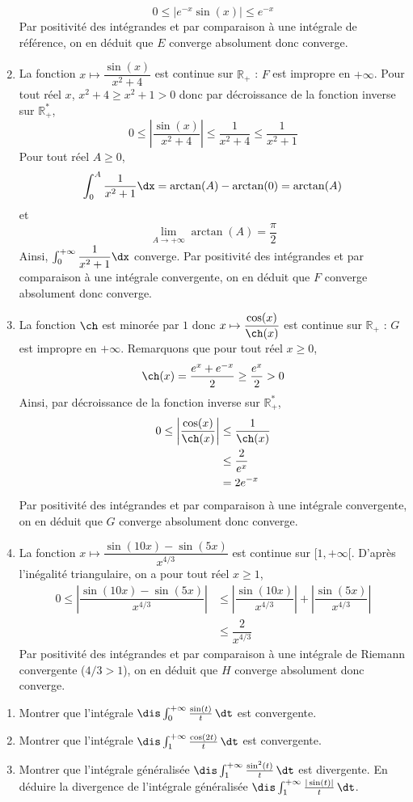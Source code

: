 \documentclass[a4paper,10pt]{report}
\begin{document}
\begin{enumerate}
$$ 0 \leq \vert  e^{-x} \sin(x)  \vert \leq e^{-x}$$
Par positivité des intégrandes et par comparaison à une intégrale de référence, on en déduit que $E$ converge absolument donc converge.
\item La fonction $x \mapsto \dfrac{\sin(x)}{x^2+4}$ est continue sur $\mathbb{R}_+$ : $F$ est impropre en $+ \infty$. Pour tout réel $x$, $x^2+4 \geq x^2+1>0$ donc par décroissance de la fonction inverse sur $\mathbb{R}_+^*$,
$$ 0 \leq \left\vert \dfrac{\sin(x)}{x^2+4} \right\vert \leq \dfrac{1}{x^2+4} \leq \dfrac{1}{x^2+1}$$
Pour tout réel $A \geq 0$,
$$ \int_0^A \dfrac{1}{x^2+1} \dx = \arctan(A)- \arctan(0)= \arctan(A)$$
et 
$$ \lim_{A \rightarrow + \infty} \arctan(A) = \dfrac{\pi}{2}$$
Ainsi, $\int_0^{+ \infty} \dfrac{1}{x^2+1} \dx$ converge. Par positivité des intégrandes et par comparaison à une intégrale convergente, on en déduit que $F$ converge absolument donc converge.
\item La fonction $\ch$ est minorée par $1$ donc $x \mapsto \dfrac{\cos(x)}{\ch(x)}$ est continue sur $\mathbb{R}_+$ : $G$ est impropre en $+ \infty$. Remarquons que pour tout réel $x \geq 0$,
$$ \ch(x) = \dfrac{e^x+e^{-x}}{2} \geq \dfrac{e^x}{2} >0$$
Ainsi, par décroissance de la fonction inverse sur $\mathbb{R}_+^*$,
\begin{align*}
0 \leq \left\vert \dfrac{\cos(x)}{\ch(x)} \right\vert & \leq \dfrac{1}{\ch(x)} \\
& \leq \dfrac{2}{e^x} \\
& = 2e^{-x}
\end{align*}
Par positivité des intégrandes et par comparaison à une intégrale convergente, on en déduit que $G$ converge absolument donc converge.
\item La fonction $x\mapsto  \dfrac{\sin(10x)-\sin(5x)}{x^{4/3}}$ est continue sur $[1, + \infty[$. D'après l'inégalité triangulaire, on a pour tout réel $x \geq 1$,
\begin{align*}
0 \leq \left\vert  \dfrac{\sin(10x)-\sin(5x)}{x^{4/3}} \right\vert & \leq \left\vert  \dfrac{\sin(10x)}{x^{4/3}} \right\vert + \left\vert  \dfrac{\sin(5x)}{x^{4/3}} \right\vert \\
& \leq \dfrac{2}{x^{4/3}}
\end{align*}
Par positivité des intégrandes et par comparaison à une intégrale de Riemann convergente ($4/3>1$), on en déduit que $H$ converge absolument donc converge.
\end{enumerate}

\begin{Exercice}{} \begin{enumerate}
\item Montrer que l'int\'egrale $\dis \int_0^{+ \infty} \frac{\sin(t)}{t}\, \dt$ est convergente.
\item Montrer que l'int\'egrale $\dis \int_1^{+\infty}\frac{\cos(2t)}{t}\, \dt$ est convergente.
\item Montrer que l'int\'egrale g\'en\'eralis\'ee $\dis \int_1^{+\infty}\frac{\sin^2(t)}{t} \, \dt$ est divergente. En d\'eduire la divergence de l'int\'egrale g\'en\'eralis\'ee $\dis \int_1^{+\infty}\frac{|\sin(t)|}{t} \, \dt$.
\end{enumerate}
\end{Exercice}
\end{document}
